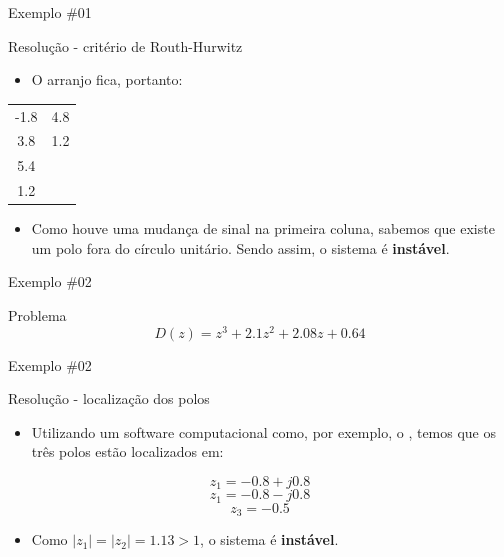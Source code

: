 \begin{frame}{Exemplo \#01}
\begin{block}{Resolução - critério de Routh-Hurwitz}
\begin{itemize}
    \item O arranjo fica, portanto:
\end{itemize}
\begin{longtable}{CC}
	\toprule
		-\num{1,8} & \num{4,8}	 \\
		 \num{3,8} & \num{1,2}	 \\
		 \num{5,4} &         	 \\
		 \num{1,2} &        	 \\
	\bottomrule 
\end{longtable}
\begin{itemize}
    \item Como houve uma mudança de sinal na primeira coluna, sabemos que existe um polo fora do círculo unitário. Sendo assim, o sistema é \textbf{instável}.
\end{itemize}
\end{block}
\end{frame}

\begin{frame}{Exemplo \#02}
\begin{block}{Problema}
	\[ D(z)=z^{3}+\num{2,1}z^{2}+\num{2,08}z+\num{0,64} \]
\end{block}
\end{frame}

\begin{frame}{Exemplo \#02}
\begin{block}{Resolução - localização dos polos}
\begin{itemize}
    \item Utilizando um software computacional como, por exemplo, o \MATLAB, temos que os três polos estão localizados em:
\end{itemize}
$$z_1 = -\num{0,8} + j\num{0,8}$$
$$z_1 = -\num{0,8} - j\num{0,8}$$
$$z_3 = -\num{0,5}$$
\begin{itemize}
    \item Como $|z_1| = |z_2| = \num{1,13} > 1$, o sistema é \textbf{instável}.
\end{itemize}
\end{block}
\end{frame}

